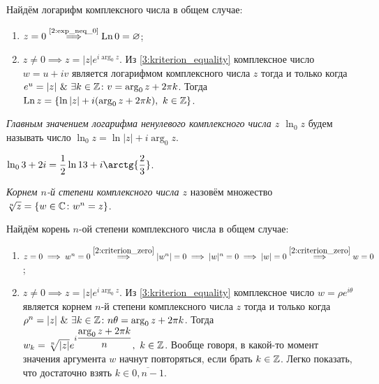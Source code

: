 Найдём логарифм комплексного числа в общем случае:

\begin{enumerate}
\item \(z = 0 \overset{\text{\ref{2:exp_neq_0}}}{\implies} \operatorname{Ln} 0 = \varnothing\);
\item \(z \neq 0 \implies z = |z|e^{i\arg_0{z}}\). Из \ref{3:kriterion_equality} комплексное число
    \(w = u + iv\) является логарифмом комплексного числа \(z\) тогда и только когда \(e^u = |z| \
    \& \ \exists k \in \mathbb{Z} \colon v = \arg_0{z} + 2 \pi k\). Тогда \(\operatorname{Ln}{z} = \{\ln{|z|} + i(\arg_0{z}
    + 2\pi k), \ k \in \mathbb{Z}\}\).
\end{enumerate}

\begin{definition}
\textit{Главным значением логарифма ненулевого комплексного числа \(z\) \(\ln_0{z}\)} будем называть
число \(\ln_0{z} = \ln{|z|} + i \arg_0{z}\).
\end{definition}

\begin{example}
\(\ln_0{3 + 2i} = \dfrac{1}{2} \ln{13} + i\arctg{\dfrac{2}{3}}\).
\end{example}

\begin{definition}
\textit{Корнем \(n\)-й степени комплексного числа \(z\)} назовём множество \(\sqrt[n]{z} = \{w \in
\mathbb{C} \colon w^n = z\}\).
\end{definition}

Найдём корень $n$-ой степени комплексного числа в общем случае:

\begin{enumerate}
\item \(z = 0 \implies w^n = 0 \overset{\ref{2:criterion_zero}}{\implies} |w^n| = 0 \implies |w|^n =
    0 \implies |w| = 0 \overset{\ref{2:criterion_zero}}{\implies} w = 0\);
\item \(z \neq 0 \implies z = |z|e^{i\arg_0{z}}\). Из \ref{3:kriterion_equality} комплексное число
    \(w = \rho e^{i\theta}\) является корнем \(n\)-й степени комплексного числа \(z\) тогда и только
    когда \(\rho^n = |z| \ \& \ \exists k \in \Z \colon n\theta = \arg_0{z} + 2 \pi k\). Тогда \(w_k
    = \sqrt[n]{|z|}e^{i\dfrac{\arg_0{z} + 2 \pi k}{n}}, \ k \in \mathbb{Z}\). Вообще говоря, в какой-то
    момент значения аргумента \(w\) начнут повторяться, если брать \(k \in \mathbb{Z}\). Легко показать, что
    достаточно взять \(k \in \overline{0, n-1}\).
\end{enumerate}

